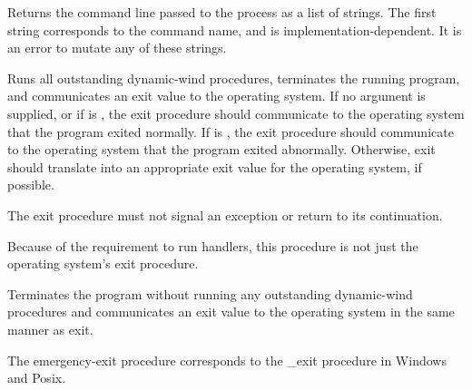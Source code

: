 \begin{entry}{%
}

Returns the command line passed to the process as a list of
strings.  The first string corresponds to the command name, and is
implementation-dependent.  It is an error to mutate any of these strings.
\end{entry}

\begin{entry}{%
}

Runs all outstanding dynamic-wind  procedures, terminates the
running program, and communicates an exit value to the operating system.
If no argument is supplied, or if  is \schtrue{}, the {\cf
exit} procedure should communicate to the operating system that the
program exited normally.  If  is \schfalse{}, the {\cf exit}
procedure should communicate to the operating system that the program
exited abnormally.  Otherwise, {\cf exit} should translate  into
an appropriate exit value for the operating system, if possible.

The {\cf exit} procedure
must not signal an exception or return to its continuation.

\begin{note}
Because of the requirement to run handlers, this procedure is not just the
operating system's exit procedure.
\end{note}

\end{entry}

\begin{entry}{%
}

Terminates the program without running any
outstanding dynamic-wind  procedures
and communicates an exit value to the operating system
in the same manner as {\cf exit}.

\begin{note}
The {\cf emergency-exit} procedure corresponds to the {\cf \_exit} procedure
in Windows and Posix.
\end{note}

\end{entry}



